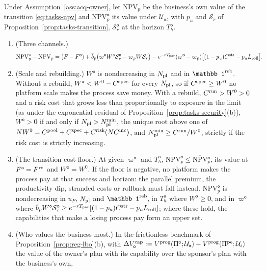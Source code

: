 \begin{proposition}\label{prop:acq-owner}
Under Assumption~\ref{ass:acq-owner}, let $\mathrm{NPV}_p$ be the business's own value of the transition \eqref{eq:tasks-npv} and $\mathrm{NPV}^{\mathsf o}_p$ its value under $\mathcal U_{\mathsf o}$, with $p_u$ and $\mathcal S_r$ of Proposition~\ref{prop:tasks-transition}, $\mathcal S^{\mathsf o}_r$ at the horizon $T^{\mathsf o}_h$.
\begin{enumerate}
\item[(a)] (Three channels.)
\begin{equation}\label{eq:acq-channels}
\mathrm{NPV}^{\mathsf o}_p-\mathrm{NPV}_p=(F-F^{\mathsf o})+\bar b_p\bigl(\varpi^{\mathsf o}W^{\mathsf o}\mathcal S^{\mathsf o}_r-\varpi_pW\mathcal S_r\bigr)-e^{-rT_{\rm par}}(\varpi^{\mathsf o}-\varpi_p)\bigl[(1-p_u)C^{\rm str}-p_uL_{\rm roll}\bigr].
\end{equation}
\item[(b)] (Scale and rebuilding.) $W^{\mathsf o}$ is nondecreasing in $N_{\rm pl}$ and in $\mathbb 1^{\rm reb}$. Without a rebuild, $W^{\mathsf o}<W^0-C^{\rm spec}$ for every $N_{\rm pl}$, so if $C^{\rm spec}\ge W^0$ no platform scale makes the process save money. With a rebuild, $C^{\rm run}>W^0>0$ and a risk cost that grows less than proportionally to exposure in the limit (as under the exponential residual of Proposition~\ref{prop:tasks-security}(b)), $W^{\mathsf o}>0$ if and only if $N_{\rm pl}>N^{\min}_{\rm pl}$, the unique root above one of $NW^0=C^{\rm pool}+C^{\rm spec}+C^{\rm risk}(NC^{\rm inc})$, and $N^{\min}_{\rm pl}\ge C^{\rm run}/W^0$, strictly if the risk cost is strictly increasing.
\item[(c)] (The transition-cost floor.) At given $\varpi^{\mathsf o}$ and $T^{\mathsf o}_h$, $\mathrm{NPV}^{\mathsf o}_p\le\overline{\mathrm{NPV}}{}^{\mathsf o}_p$, its value at $F^{\mathsf o}=F^{\rm rd}$ and $W^{\mathsf o}=W^0$. If the floor is negative, no platform makes the process pay at that success and horizon: the parallel premium, the productivity dip, stranded costs or rollback must fall instead. $\mathrm{NPV}^{\mathsf o}_p$ is nondecreasing in $u_F$, $N_{\rm pl}$ and $\mathbb 1^{\rm reb}$, in $T^{\mathsf o}_h$ where $W^{\mathsf o}\ge0$, and in $\varpi^{\mathsf o}$ where $\bar b_pW^{\mathsf o}\mathcal S^{\mathsf o}_r\ge e^{-rT_{\rm par}}[(1-p_u)C^{\rm str}-p_uL_{\rm roll}]$; where these hold, the capabilities that make a losing process pay form an upper set.
\item[(d)] (Who values the business most.) In the frictionless benchmark of Proposition~\ref{prop:reg-lbo}(b), with $\Delta V^{\rm cap}_{\mathsf o}:=V^{\rm prog}(\Pi^{\mathsf o};\mathcal U_{\mathsf o})-V^{\rm prog}(\Pi^{\rm pe};\mathcal U_i)$ the value of the owner's plan with its capability over the sponsor's plan with the business's own,

\end{enumerate}
\end{proposition}
